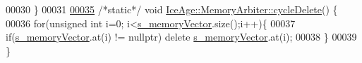 \begin{DoxyCode}
00030 \}
00031 
\hypertarget{MemoryArbiter_8cpp_source.tex_l00035}{}\hyperlink{classIceAge_1_1MemoryArbiter_ae3460492678cf992629f4a70de3ef1ca}{00035} \textcolor{comment}{/*static*/} \textcolor{keywordtype}{void} \hyperlink{classIceAge_1_1MemoryArbiter_ae3460492678cf992629f4a70de3ef1ca}{IceAge::MemoryArbiter::cycleDelete}() \{
00036     \textcolor{keywordflow}{for}(\textcolor{keywordtype}{unsigned} \textcolor{keywordtype}{int} i=0; i<\hyperlink{classIceAge_1_1MemoryArbiter_a23e5c384f4c4526d7caf0954668d6543}{s\_memoryVector}.size();i++)\{
00037         \textcolor{keywordflow}{if}(\hyperlink{classIceAge_1_1MemoryArbiter_a23e5c384f4c4526d7caf0954668d6543}{s\_memoryVector}.at(i) != \textcolor{keyword}{nullptr}) \textcolor{keyword}{delete} \hyperlink{classIceAge_1_1MemoryArbiter_a23e5c384f4c4526d7caf0954668d6543}{s\_memoryVector}.at(i); 
00038     \}
00039 \}
\end{DoxyCode}
